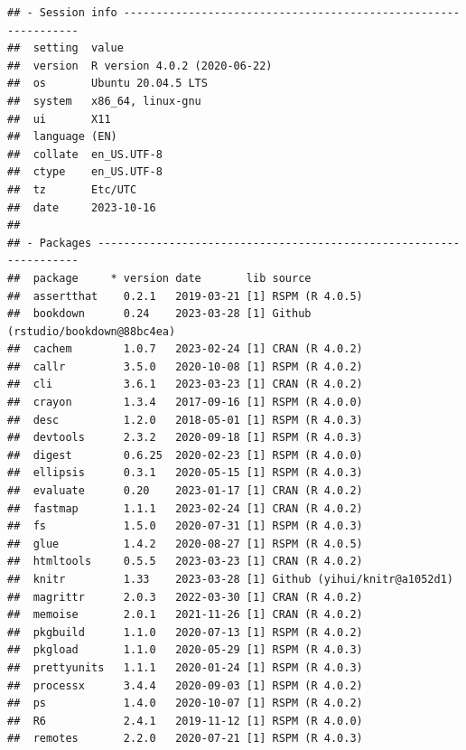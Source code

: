 \documentclass[
]{book}
\begin{document}
\begin{verbatim}
## - Session info ---------------------------------------------------------------
##  setting  value                       
##  version  R version 4.0.2 (2020-06-22)
##  os       Ubuntu 20.04.5 LTS          
##  system   x86_64, linux-gnu           
##  ui       X11                         
##  language (EN)                        
##  collate  en_US.UTF-8                 
##  ctype    en_US.UTF-8                 
##  tz       Etc/UTC                     
##  date     2023-10-16                  
## 
## - Packages -------------------------------------------------------------------
##  package     * version date       lib source                            
##  assertthat    0.2.1   2019-03-21 [1] RSPM (R 4.0.5)                    
##  bookdown      0.24    2023-03-28 [1] Github (rstudio/bookdown@88bc4ea) 
##  cachem        1.0.7   2023-02-24 [1] CRAN (R 4.0.2)                    
##  callr         3.5.0   2020-10-08 [1] RSPM (R 4.0.2)                    
##  cli           3.6.1   2023-03-23 [1] CRAN (R 4.0.2)                    
##  crayon        1.3.4   2017-09-16 [1] RSPM (R 4.0.0)                    
##  desc          1.2.0   2018-05-01 [1] RSPM (R 4.0.3)                    
##  devtools      2.3.2   2020-09-18 [1] RSPM (R 4.0.3)                    
##  digest        0.6.25  2020-02-23 [1] RSPM (R 4.0.0)                    
##  ellipsis      0.3.1   2020-05-15 [1] RSPM (R 4.0.3)                    
##  evaluate      0.20    2023-01-17 [1] CRAN (R 4.0.2)                    
##  fastmap       1.1.1   2023-02-24 [1] CRAN (R 4.0.2)                    
##  fs            1.5.0   2020-07-31 [1] RSPM (R 4.0.3)                    
##  glue          1.4.2   2020-08-27 [1] RSPM (R 4.0.5)                    
##  htmltools     0.5.5   2023-03-23 [1] CRAN (R 4.0.2)                    
##  knitr         1.33    2023-03-28 [1] Github (yihui/knitr@a1052d1)      
##  magrittr      2.0.3   2022-03-30 [1] CRAN (R 4.0.2)                    
##  memoise       2.0.1   2021-11-26 [1] CRAN (R 4.0.2)                    
##  pkgbuild      1.1.0   2020-07-13 [1] RSPM (R 4.0.2)                    
##  pkgload       1.1.0   2020-05-29 [1] RSPM (R 4.0.3)                    
##  prettyunits   1.1.1   2020-01-24 [1] RSPM (R 4.0.3)                    
##  processx      3.4.4   2020-09-03 [1] RSPM (R 4.0.2)                    
##  ps            1.4.0   2020-10-07 [1] RSPM (R 4.0.2)                    
##  R6            2.4.1   2019-11-12 [1] RSPM (R 4.0.0)                    
##  remotes       2.2.0   2020-07-21 [1] RSPM (R 4.0.3)                    

\end{verbatim}
\end{document}
